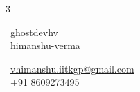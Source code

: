 \documentclass[a4paper,10pt]{extarticle}
\begin{document}

\pagestyle{empty} %





\begin{multicols}{3}
\raggedright
\normalsize \faGithub\ {\href{https://github.com/ghostdevhv}{ghostdevhv}}\\[4pt]
\normalsize \faLinkedinSquare\ {\href{https://www.linkedin.com/in/himanshu-verma-1b930990/}{himanshu-verma}}

\columnbreak

\centering
\vspace*{\fill}
\vspace*{\fill}

\columnbreak

\raggedleft
\normalsize \faEnvelope\ {\href{mailto:vhimanshu.iitkgp@gmail.com}{vhimanshu.iitkgp@gmail.com}}\\[4pt]
\normalsize \faPhone\ +91 8609273495
\end{multicols}
\end{document}
